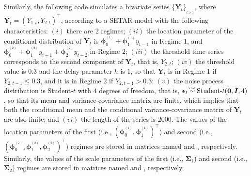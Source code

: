 Similarly, the following code simulates a bivariate series $\{\bm{Y}_t\}_{_{t\geq 1}}$, where $\bm{Y}_t=(Y_{1,t},Y_{2,t})^{\!\top}$, according to a SETAR model with the following characteristics: $(i)$ there are 2 regimes; $(ii)$ the location parameter of the conditional distribution of $\bm{Y}_t$ is $\bm{\phi}_0^{^{(1)}} + \bm{\phi}_1^{^{(1)}}y_{t-1}$ in Regime 1, and $\bm{\phi}_0^{^{(2)}} + \bm{\phi}_1^{^{(2)}}y_{t-1} + \bm{\phi}_2^{^{(2)}}y_{t-2}$ in Regime 2; $(iii)$ the threshold time series corresponds to the second component of $\bm{Y}_t$, that is, $Y_{2,t}$; $(iv)$ the threshold value is 0.3 and the delay parameter $h$ is $1$, so that $\bm{Y}_t$ is in Regime 1 if $Y_{2,t-1}\leq 0.3$, and it is in Regime 2 if $Y_{2,t-1} > 0.3$; $(v)$ the noise process distribution is Student-$t$ with $4$ degrees of freedom, that is, $\bm{\epsilon}_t \myeq \text{Student-}t({\bf 0},\bm{I},4)$, so that its mean and variance-covariance matrix are finite, which implies that both the conditional mean and the conditional variance-covariance matrix of $\bm{Y}_t$ are also finite; and $(vi)$ the length of the series is $2000$. The values of the location parameters of the first (i.e., $(\bm{\phi}_0^{^{(1)}},\bm{\phi}_1^{^{(1)}})^{\!\top}$) and second (i.e., $(\bm{\phi}_0^{^{(2)}},\bm{\phi}_1^{^{(2)}},\bm{\phi}_2^{^{(2)}})^{\!\top}$) regimes are stored in matrices named  and , respectively. Similarly, the values of the scale parameters of the first (i.e., $\bm{\Sigma}_1$) and second (i.e., $\bm{\Sigma}_2$) regimes are stored in matrices named  and , respectively.

